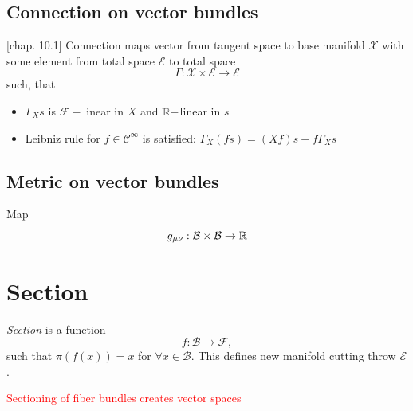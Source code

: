 \subsection{Connection on vector bundles}
\citep{lu}[chap. 10.1]
Connection maps vector from tangent space to base manifold $\mathcal{X}$ with some element from total space $\mathcal{E}$ to total space
$$\Gamma: \mathcal{X}\times \mathcal{E}\rightarrow \mathcal{E}$$
such, that
\begin{itemize}
    \item $\Gamma_X s$ is $\mathcal{F}-$linear in $X$ and $\mathbb{R}-$linear in $s$
    \item Leibniz rule for $f\in \mathcal{C}^\infty$ is satisfied: $\Gamma_X(f s) = (X f)s+f\Gamma_X s$
\end{itemize}


\subsection{Metric on vector bundles}
Map
$$g_{\mu\nu}: \mathcal{B}\times \mathcal{B} \rightarrow \mathbb{R}$$

\section{Section}
\label{sec:section}
\emph{Section} is a function
$$f:\mathcal{B}\rightarrow \mathcal{F},$$
such that $\pi(f(x))=x$ for $\forall x\in \mathcal{B}$. This defines new manifold cutting throw $\mathcal{E}$.

\textcolor{red}{Sectioning of fiber bundles creates vector spaces}


